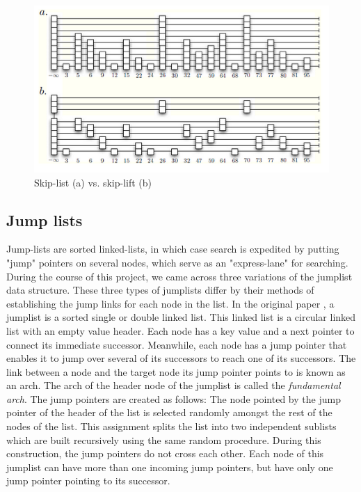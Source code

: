 \documentclass[oribibl]{llncs}
\begin{document}
\begin{figure}[here]
\center
\includegraphics[width=12cm]{images/skiplist_vs_skiplift}
\caption{Skip-list (a)  vs. skip-lift (b)}
\label{fig:skiplist_vs_skiplift}
\end{figure}


\subsection{Jump lists}

Jump-lists \cite{jump_list} are sorted linked-lists, in which case search is expedited by putting "jump" pointers on several nodes, which serve as an "express-lane" for searching. During the course of this project, we came across three variations of the jumplist data structure. These three types of jumplists differ by their methods of establishing the jump links for each node in the list. In the original paper \cite{jump_list}, a jumplist is a sorted single or double linked list. This linked list is a circular linked list with an empty value header. Each node has a key value and a next pointer to connect its immediate successor. Meanwhile, each node has a jump pointer that enables it to jump over several of its successors to reach one of its successors. The link between a node and the target node its jump pointer points to is known as an arch. The arch of the header node of the jumplist is called the {\it fundamental arch}. The jump pointers are created as follows: The node pointed by the jump pointer of the header of the list is selected randomly amongst the rest of the nodes of the list. This assignment splits the list into two independent sublists which are built recursively using the same random procedure. During this construction, the jump pointers do not cross each other. Each node of this jumplist can have more than one incoming jump pointers, but have only one jump pointer pointing to its successor.
\end{document}
